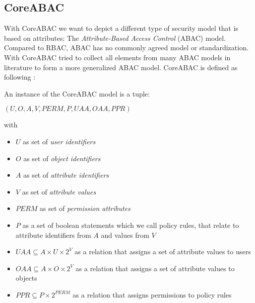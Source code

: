 \documentclass[twoside, openright, 12pt]{book}
\begin{document}
%



\subsection{CoreABAC}
With CoreABAC we want to depict a different type of security model that is based on attributes: The \textit{Attribute-Based Access Control} (ABAC) model.
Compared to RBAC, ABAC has no commonly agreed model or standardization.
With CoreABAC \cite{Servos17} tried to collect all elements from many ABAC models in literature to form a more generalized ABAC model.
CoreABAC is defined as following \citep{Amthor18, Servos17}:

\begin{xdefinition}[CoreABAC] 
An instance of the CoreABAC model is a tuple:
\begin{center}
$(U, O, A, V, \mathit{PERM}, P, \textit{UAA}, \mathit{OAA}, \mathit{PPR})$ 
\end{center}
\noindent
with

\begin{itemize}
\setlength\itemsep{0em}
\item $U$ as set of \textit{user identifiers}
\item $O$ as set of \textit{object identifiers}
\item $A$ as set of \textit{attribute identifiers}
\item $V$ as set of \textit{attribute values}
\item $\mathit{PERM}$ as set of \textit{permission attributes}
\item $P$ as a set of boolean statements which we call policy rules, that relate to attribute identifiers from $A$ and values from $V$
\item $\mathit{UAA} \subseteq A \times U \times 2^V$ as a relation that assigns a set of attribute values to users
\item $\mathit{OAA} \subseteq A \times O \times 2^V$ as a relation that assigns a set of attribute values to objects
\item $\mathit{PPR} \subseteq P \times 2^{\mathit{PERM}}$ as a relation that assigns permissions to policy rules
\end{itemize}
\label{definition:CoreABAC}
\end{xdefinition}
\end{document}
